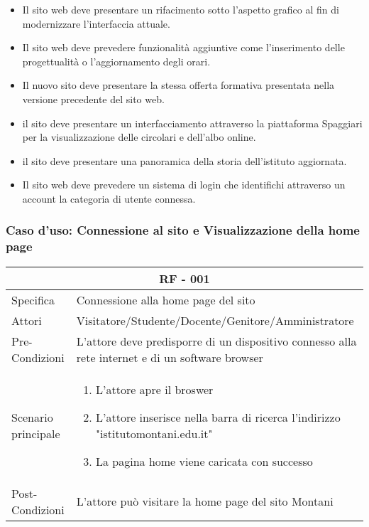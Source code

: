 \documentclass{article}
\begin{document}
\begin{itemize}
	\item Il sito web deve presentare un rifacimento sotto l'aspetto grafico al fin di modernizzare l'interfaccia attuale.
	\item Il sito web deve prevedere funzionalità aggiuntive come l'inserimento delle progettualità o l'aggiornamento degli orari.
	\item Il nuovo sito deve presentare la stessa offerta formativa presentata nella versione precedente del sito web.
	\item il sito deve presentare un interfacciamento attraverso la piattaforma Spaggiari per la visualizzazione delle circolari e dell'albo online.
	\item il sito deve presentare una panoramica della storia dell'istituto aggiornata.
	\item Il sito web deve prevedere un sistema di login che identifichi attraverso un account la categoria di utente connessa.
\end{itemize}
\subsubsection{\textbf{Caso d'uso: Connessione al sito e Visualizzazione della home page}}
\begin{tabular}{ |p{3cm}|p{9cm}|  }
	\hline
	\multicolumn{2}{|c|}{\textbf{RF - 001}} \\
	\hline
	Specifica& Connessione alla home page del sito\\
	\hline
	Attori& Visitatore/Studente/Docente/Genitore/Amministratore\\
	\hline
	Pre-Condizioni& L'attore deve predisporre di un dispositivo connesso alla rete internet e di un software browser\\
	\hline
	Scenario principale& \begin{enumerate}
		\item L'attore apre il broswer
		\item L'attore inserisce nella barra di ricerca l'indirizzo "istitutomontani.edu.it"
		\item La pagina home viene caricata con successo
	\end{enumerate}\\
	\hline
	Post-Condizioni& L'attore può visitare la home page del sito Montani\\
	\hline
\end{tabular}
\clearpage
\end{document}
